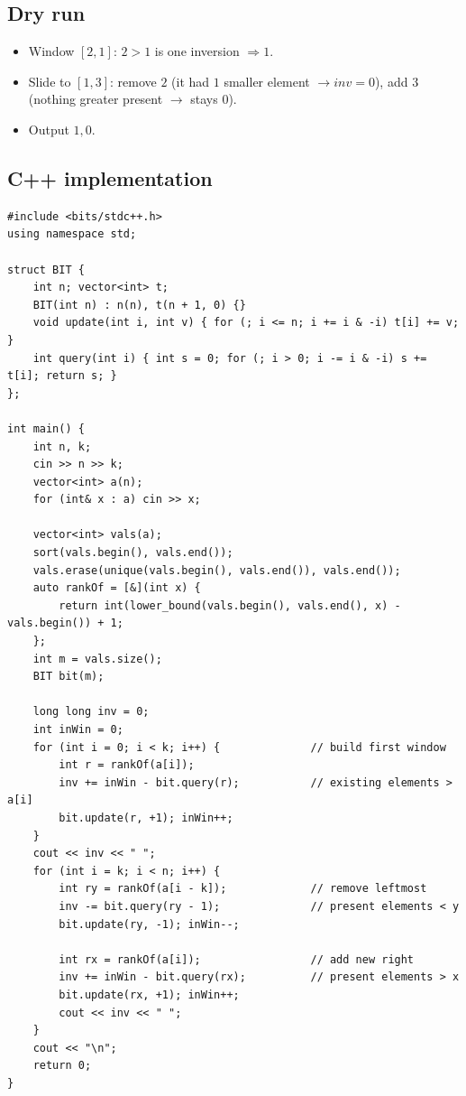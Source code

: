 \subsection*{Dry run}


\begin{itemize}
  \item Window $[2,1]$: $2>1$ is one inversion $\Rightarrow1$.
  \item Slide to $[1,3]$: remove $2$ (it had $1$ smaller element $\to
        \textit{inv}=0$), add $3$ (nothing greater present $\to$ stays
        $0$).
  \item Output $1,0$.
\end{itemize}

\subsection*{C++ implementation}

\begin{lstlisting}
#include <bits/stdc++.h>
using namespace std;

struct BIT {
    int n; vector<int> t;
    BIT(int n) : n(n), t(n + 1, 0) {}
    void update(int i, int v) { for (; i <= n; i += i & -i) t[i] += v; }
    int query(int i) { int s = 0; for (; i > 0; i -= i & -i) s += t[i]; return s; }
};

int main() {
    int n, k;
    cin >> n >> k;
    vector<int> a(n);
    for (int& x : a) cin >> x;

    vector<int> vals(a);
    sort(vals.begin(), vals.end());
    vals.erase(unique(vals.begin(), vals.end()), vals.end());
    auto rankOf = [&](int x) {
        return int(lower_bound(vals.begin(), vals.end(), x) - vals.begin()) + 1;
    };
    int m = vals.size();
    BIT bit(m);

    long long inv = 0;
    int inWin = 0;
    for (int i = 0; i < k; i++) {              // build first window
        int r = rankOf(a[i]);
        inv += inWin - bit.query(r);           // existing elements > a[i]
        bit.update(r, +1); inWin++;
    }
    cout << inv << " ";
    for (int i = k; i < n; i++) {
        int ry = rankOf(a[i - k]);             // remove leftmost
        inv -= bit.query(ry - 1);              // present elements < y
        bit.update(ry, -1); inWin--;

        int rx = rankOf(a[i]);                 // add new right
        inv += inWin - bit.query(rx);          // present elements > x
        bit.update(rx, +1); inWin++;
        cout << inv << " ";
    }
    cout << "\n";
    return 0;
}
\end{lstlisting}

